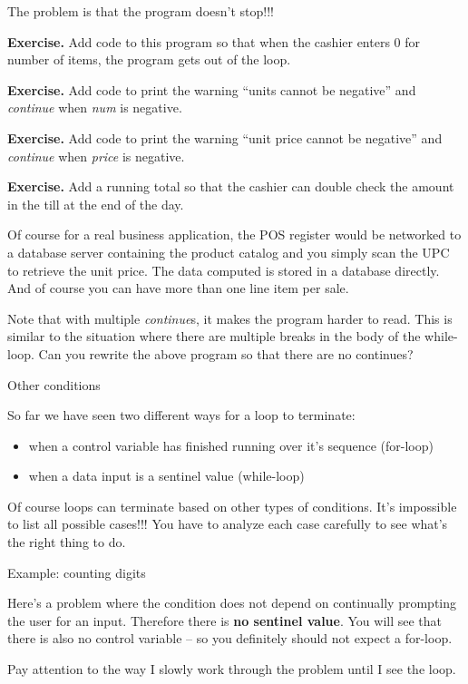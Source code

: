 \documentclass[
]{article}
\providecommand{\tightlist}{%
  \setlength{\itemsep}{0pt}\setlength{\parskip}{0pt}}
\begin{document}
The problem is that the program doesn't stop!!!

\textbf{Exercise. }Add code to this program so that when the cashier
enters 0 for number of items, the program gets out of the loop.

\textbf{Exercise.} Add code to print the warning ``units cannot be
negative'' and \emph{continue} when \emph{num} is negative.

\textbf{Exercise.} Add code to print the warning ``unit price cannot be
negative'' and \emph{continue} when \emph{price} is negative.

\textbf{Exercise.} Add a running total so that the cashier can double
check the amount in the till at the end of the day.

Of course for a real business application, the POS register would be
networked to a database server containing the product catalog and you
simply scan the UPC to retrieve the unit price. The data computed is
stored in a database directly. And of course you can have more than one
line item per sale.

Note that with multiple \emph{continue}s, it makes the program harder to
read. This is similar to the situation where there are multiple breaks
in the body of the while-loop. Can you rewrite the above program so that
there are no continues?

Other conditions

So far we have seen two different ways for a loop to terminate:

\begin{itemize}
\tightlist
\item
  when a control variable has finished running over it's sequence
  (for-loop)
\item
  when a data input is a sentinel value (while-loop)
\end{itemize}

Of course loops can terminate based on other types of conditions. It's
impossible to list all possible cases!!! You have to analyze each case
carefully to see what's the right thing to do.

Example: counting digits

Here's a problem where the condition does not depend on continually
prompting the user for an input. Therefore there is \textbf{no sentinel
value}. You will see that there is also no control variable -- so you
definitely should not expect a for-loop.

Pay attention to the way I slowly work through the problem until I see
the loop.
\end{document}
